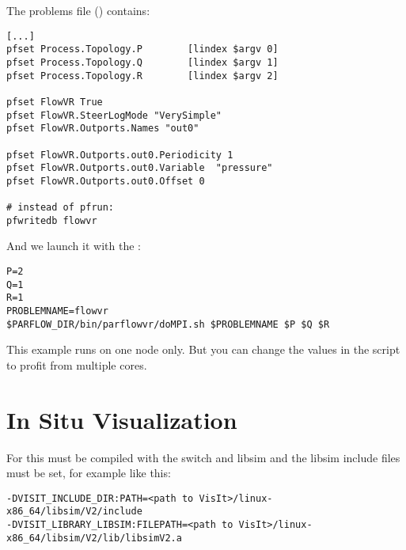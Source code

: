 The problems  file () contains:
\begin{display}\begin{verbatim}
[...]
pfset Process.Topology.P        [lindex $argv 0]
pfset Process.Topology.Q        [lindex $argv 1]
pfset Process.Topology.R        [lindex $argv 2]

pfset FlowVR True
pfset FlowVR.SteerLogMode "VerySimple"
pfset FlowVR.Outports.Names "out0"

pfset FlowVR.Outports.out0.Periodicity 1
pfset FlowVR.Outports.out0.Variable  "pressure"
pfset FlowVR.Outports.out0.Offset 0

# instead of pfrun:
pfwritedb flowvr
\end{verbatim}\end{display}

And we launch it with the :
\begin{display}\begin{verbatim}
P=2
Q=1
R=1
PROBLEMNAME=flowvr
$PARFLOW_DIR/bin/parflowvr/doMPI.sh $PROBLEMNAME $P $Q $R
\end{verbatim}\end{display}

This example runs on one node only. But you can change the  values in the 
script to profit from multiple cores.

\section{In Situ Visualization}
For this \parflow{} must be compiled with the 
switch and libsim and the libsim include files must be set, for example like this:
\begin{display}\begin{verbatim}
-DVISIT_INCLUDE_DIR:PATH=<path to VisIt>/linux-x86_64/libsim/V2/include
-DVISIT_LIBRARY_LIBSIM:FILEPATH=<path to VisIt>/linux-x86_64/libsim/V2/lib/libsimV2.a
\end{verbatim}\end{display}

